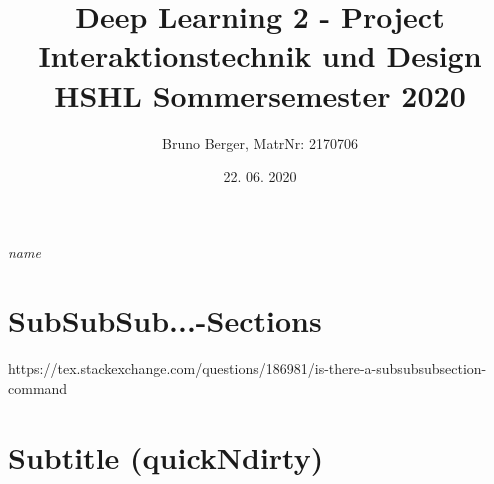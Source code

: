 \begin{flushright}
\emph{name}
\end{flushright}

\section{SubSubSub...-Sections}

https://tex.stackexchange.com/questions/186981/is-there-a-subsubsubsection-command


\section{Subtitle (quickNdirty)}

\title{Deep Learning 2 - Project\\
    \vspace{+14pt}
        \Large Interaktionstechnik und Design \\
        HSHL  Sommersemester 2020}
\author{Bruno Berger, MatrNr: 2170706}
\date{22. 06. 2020}
